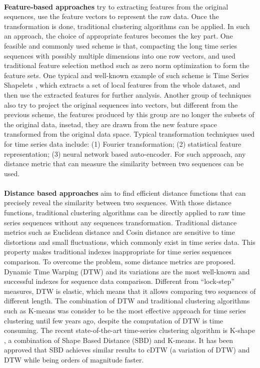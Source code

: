\\\textbf{Feature-based approaches} try to extracting features from the original sequences, use the feature vectors to represent the raw data. Once the transformation is done, traditional clustering algorithms can be applied. In such an approach, the choice of appropriate features becomes the key part. One feasible and commonly used scheme is that, compacting the long time series sequences with possibly multiple dimensions into one row vectors, and used traditional feature selection method such as zero norm optimization \cite{chakraborty2007feature} to form the feature sets. One typical and well-known example of such scheme is Time Series Shapelets \cite{ye2009time}, which extracts a set of local features from the whole dataset, and then use the extracted features for further analysis. Another group of techniques also try to project the original sequences into vectors, but different from the previous scheme, the features produced by this group are no longer the subsets of the original data, insetad, they are drawn from the new feature space transformed from the original data space. Typical transformation techniques used for time series data include: (1) Fourier transformation; (2) statistical feature representation; (3) neural network based auto-encoder. For such approach, any distance metric that can measure the similarity between two sequences can be used.\\
\\\textbf{Distance based approaches} aim to find efficient distance functions that can precisely reveal the similarity between two sequences. With those distance functions, traditional clustering algorithms can be directly applied to raw time series sequences without any sequences transformation. Traditional distance metrics such as Euclidean distance and Cosin distance are sensitive to time distortions and small fluctuations, which commonly exist in time series data. This property makes traditional indexes inappropriate for time series sequences comparison. To overcome the problem, some distance metrics are proposed. Dynamic Time Warping (DTW) and its variations are the most well-known and successful indexes for sequence data comparison. Different from ``lock-step'' measures, DTW is elastic, which means that it allows comparing two sequences of different length. The combination of DTW and traditional clustering algorithms such as K-means was consider to be the most effective approach for time series clustering until few years ago, despite the computation of DTW is time consuming. The recent state-of-the-art time-series clustering algorithm is K-shape \cite{paparrizos2015k}, a combination of Shape Based Distance (SBD) and K-means. It has been approved that SBD achieves similar results to cDTW (a variation of DTW) and DTW while being orders of magnitude faster. 

